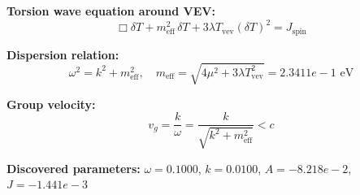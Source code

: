 
\textbf{Torsion wave equation around VEV:}
\begin{equation}
  \Box \delta T + m_{\text{eff}}^2 \, \delta T + 3\lambda T_{\text{vev}} (\delta T)^2 = J_{\text{spin}}
\end{equation}

\textbf{Dispersion relation:}
\begin{equation}
  \omega^2 = k^2 + m_{\text{eff}}^2, \quad
  m_{\text{eff}} = \sqrt{4\mu^2 + 3\lambda T_{\text{vev}}^2} = 2.3411e-1 \text{ eV}
\end{equation}

\textbf{Group velocity:}
\begin{equation}
  v_g = \frac{k}{\omega} = \frac{k}{\sqrt{k^2 + m_{\text{eff}}^2}} < c
\end{equation}

\textbf{Discovered parameters:}
$\omega = 0.1000$, \quad
$k = 0.0100$, \quad
$A = -8.218e-2$, \quad
$J = -1.441e-3$